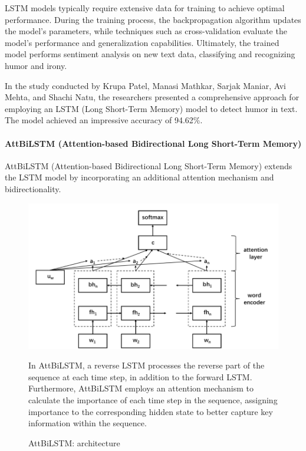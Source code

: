 \documentclass[a4paper]{article}
\begin{document}
LSTM models typically require extensive data for training to achieve optimal performance. During the training process, the backpropagation algorithm updates the model's parameters, while techniques such as cross-validation evaluate the model's performance and generalization capabilities. Ultimately, the trained model performs sentiment analysis on new text data, classifying and recognizing humor and irony.

In the study conducted by Krupa Patel, Manasi Mathkar, Sarjak Maniar, Avi Mehta, and Shachi Natu, the researchers presented a comprehensive approach for employing an LSTM (Long Short-Term Memory) model to detect humor in text. The model achieved an impressive accuracy of 94.62\%.\cite{ref_rnn3}

\paragraph{AttBiLSTM (Attention-based Bidirectional Long Short-Term Memory)}

AttBiLSTM (Attention-based Bidirectional Long Short-Term Memory) extends the LSTM model by incorporating an additional attention mechanism and bidirectionality.

\begin{figure}[H]
    \centering
    \begin{minipage}{0.48\textwidth}
        \centering
        \includegraphics[width=1\textwidth]{./images/AttBiLSTM_architecture.png}
        \caption{AttBiLSTM:  architecture \cite{ref_rnn2}}
        \label{fig.AttBiLSTM}
    \end{minipage}\hfill
    \begin{minipage}{0.48\textwidth}
        In AttBiLSTM, a reverse LSTM processes the reverse part of the sequence at each time step, in addition to the forward LSTM. Furthermore, AttBiLSTM employs an attention mechanism to calculate the importance of each time step in the sequence, assigning importance to the corresponding hidden state to better capture key information within the sequence.
    \end{minipage}
\end{figure}
\end{document}
